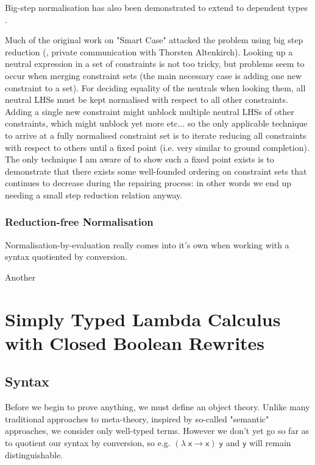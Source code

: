 \documentclass[
    a4paper, %
    fontsize=11pt, %
    twoside=false, %
	numbers=noenddot, %
	fontmethod=tex, %
]{kaobook}
\newcommand{\Varid}[1]{\mathit{#1}}
\renewcommand\Varid[1]{\mathord{\textsf{#1}}}
\begin{document}
Big-step normalisation has also been demonstrated to extend to
dependent types .


Much of the original work on "Smart Case" attacked the problem using big step
reduction (, private 
communication with Thorsten Altenkirch). Looking up a neutral expression
in a set of constraints is not too tricky, but problems seem to occur when
merging constraint sets (the main necessary case is adding one new constraint
to a set). For deciding equality of the neutrals when looking them, all neutral
LHSs must be kept normalised with respect to all other constraints. Adding a
single new constraint might unblock multiple neutral LHSs of other constraints,
which might unblock yet more etc... so the only applicable technique to arrive
at a fully normalised constraint set is to iterate reducing all constraints
with respect to others until a fixed point (i.e. very similar to ground 
completion). The only technique I am aware of to show such a fixed point exists
is to demonstrate that there exists some well-founded ordering on constraint
sets that continues to decrease during the repairing process: in other words
we end up needing a small step reduction relation anyway.


\subsection{Reduction-free Normalisation}

Normalisation-by-evaluation really comes into it's own when working with a
syntax quotiented by conversion.

Another 


\chapter{Simply Typed Lambda Calculus with Closed Boolean Rewrites}

\section{Syntax}

Before we begin to prove anything, we must define an object theory.
Unlike many traditional approaches to meta-theory, inspired by so-called 
"semantic"  
approaches, we consider only well-typed terms. 
However we don't yet go so far as to quotient our syntax by conversion,
so e.g. \ensuremath{(\Varid{λ}\;\Varid{x}\;\Varid{→}\;\Varid{x})\;\Varid{y}} and \ensuremath{\Varid{y}} will remain distinguishable.
\end{document}
